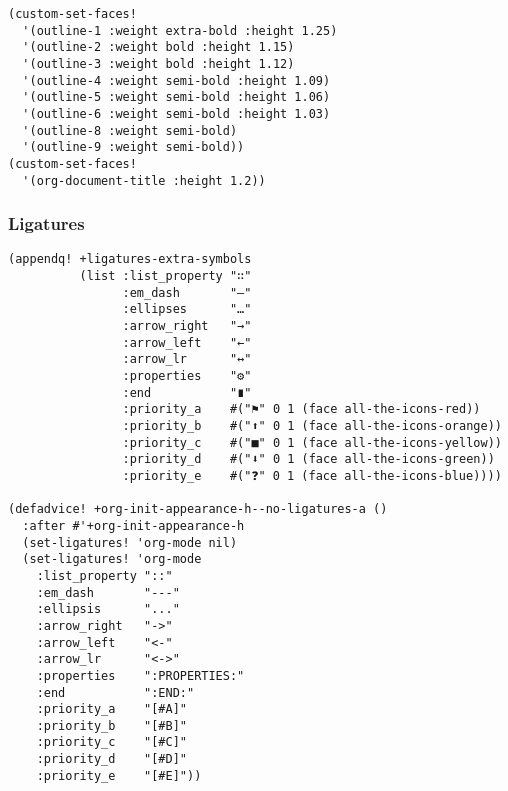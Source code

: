\documentclass[c]{article}
\theoremstyle{plain}%
\theoremstyle{definition}
\theoremstyle{remark}
\begin{document}
\begin{verbatim}
(custom-set-faces!
  '(outline-1 :weight extra-bold :height 1.25)
  '(outline-2 :weight bold :height 1.15)
  '(outline-3 :weight bold :height 1.12)
  '(outline-4 :weight semi-bold :height 1.09)
  '(outline-5 :weight semi-bold :height 1.06)
  '(outline-6 :weight semi-bold :height 1.03)
  '(outline-8 :weight semi-bold)
  '(outline-9 :weight semi-bold))
(custom-set-faces!
  '(org-document-title :height 1.2))
\end{verbatim}

\subsubsection{Ligatures}
\label{sec:orgec01ba9}
\begin{verbatim}
(appendq! +ligatures-extra-symbols
          (list :list_property "∷"
                :em_dash       "—"
                :ellipses      "…"
                :arrow_right   "→"
                :arrow_left    "←"
                :arrow_lr      "↔"
                :properties    "⚙"
                :end           "∎"
                :priority_a    #("⚑" 0 1 (face all-the-icons-red))
                :priority_b    #("⬆" 0 1 (face all-the-icons-orange))
                :priority_c    #("■" 0 1 (face all-the-icons-yellow))
                :priority_d    #("⬇" 0 1 (face all-the-icons-green))
                :priority_e    #("❓" 0 1 (face all-the-icons-blue))))

(defadvice! +org-init-appearance-h--no-ligatures-a ()
  :after #'+org-init-appearance-h
  (set-ligatures! 'org-mode nil)
  (set-ligatures! 'org-mode
    :list_property "::"
    :em_dash       "---"
    :ellipsis      "..."
    :arrow_right   "->"
    :arrow_left    "<-"
    :arrow_lr      "<->"
    :properties    ":PROPERTIES:"
    :end           ":END:"
    :priority_a    "[#A]"
    :priority_b    "[#B]"
    :priority_c    "[#C]"
    :priority_d    "[#D]"
    :priority_e    "[#E]"))
\end{verbatim}
\end{document}
